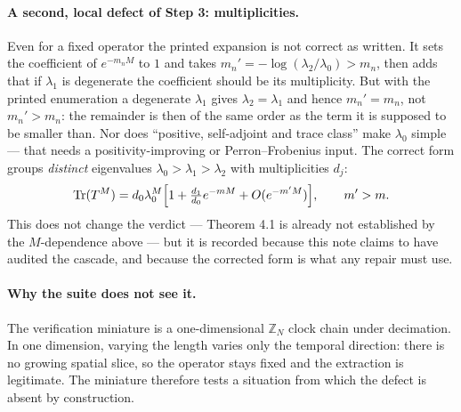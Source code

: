 \documentclass[11pt]{article}
\begin{document}
\paragraph{A second, local defect of Step 3: multiplicities.} Even for a fixed
operator the printed expansion is not correct as written. It sets the coefficient of
$e^{-m_nM}$ to $1$ and takes $m_n'=-\log(\lambda_2/\lambda_0)>m_n$, then adds that if
$\lambda_1$ is degenerate the coefficient should be its multiplicity. But with the
printed enumeration a degenerate $\lambda_1$ gives $\lambda_2=\lambda_1$ and hence
$m_n'=m_n$, not $m_n'>m_n$: the remainder is then of the same order as the term it is
supposed to be smaller than. Nor does ``positive, self-adjoint and trace class'' make
$\lambda_0$ simple --- that needs a positivity-improving or Perron--Frobenius input.
The correct form groups \emph{distinct} eigenvalues $\lambda_0>\lambda_1>\lambda_2$
with multiplicities $d_j$:
\[
\operatorname{Tr}(T^M)=d_0\lambda_0^M\Bigl[1+\tfrac{d_1}{d_0}e^{-mM}
+O(e^{-m'M})\Bigr],\qquad m'>m .
\]
This does not change the verdict --- Theorem 4.1 is already not established by the
$M$-dependence above --- but it is recorded because this note claims to have audited
the cascade, and because the corrected form is what any repair must use.

\paragraph{Why the suite does not see it.} The verification miniature is a
one-dimensional $\mathbb Z_N$ clock chain under decimation. In one dimension, varying
the length varies only the temporal direction: there is no growing spatial slice, so
the operator stays fixed and the extraction is legitimate. The miniature therefore
tests a situation from which the defect is absent by construction.
\end{document}

